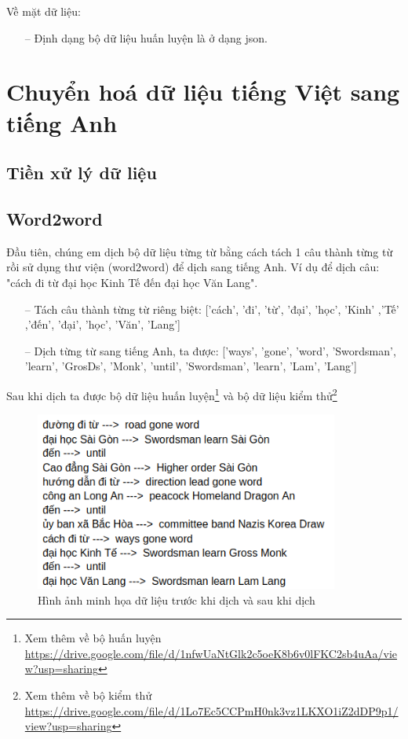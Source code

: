 Về mặt dữ liệu:
\begin{itemize}
    \item[--] Định dạng bộ dữ liệu huấn luyện là ở dạng json.
\end{itemize}

\section{Chuyển hoá dữ liệu tiếng Việt sang tiếng Anh}
\subsection{Tiền xử lý dữ liệu}

\subsection{Word2word}

Đầu tiên, chúng em dịch bộ dữ liệu từng từ bằng cách tách 1 câu thành từng từ rồi sử dụng thư viện (word2word) để dịch sang tiếng Anh. Ví dụ để dịch câu: "cách đi từ đại học Kinh Tế đến đại học Văn Lang".
\begin{itemize}
    \item[--] Tách câu thành từng từ riêng biệt: ['cách', 'đi', 'từ', 'đại', 'học', 'Kinh' ,'Tế' ,'đến', 'đại', 'học', 'Văn', 'Lang']
    \item[--] Dịch từng từ sang tiếng Anh, ta được: ['ways', 'gone', 'word', 'Swordsman', 'learn', 'GrosDs', 'Monk', 'until', 'Swordsman', 'learn', 'Lam', 'Lang']
\end{itemize}

Sau khi dịch ta được bộ dữ liệu huấn luyện\footnote{Xem thêm về bộ huấn luyện \url{https://drive.google.com/file/d/1nfwUaNtGlk2c5oeK8b6v0lFKC2sb4uAa/view?usp=sharing}} và bộ dữ liệu kiểm thử\footnote{Xem thêm về bộ kiểm thử \url{https://drive.google.com/file/d/1Lo7Ec5CCPmH0nk3vz1LKXO1iZ2dDP9p1/view?usp=sharing}}
\begin{figure}[htp]
    \centering
    \includegraphics[width=10cm]{images/trainingdata_dichtungtu.png}
    \caption{Hình ảnh minh họa dữ liệu trước khi dịch và sau khi dịch}
    \label{fig:trainingdata_dichtungtu}
\end{figure}



